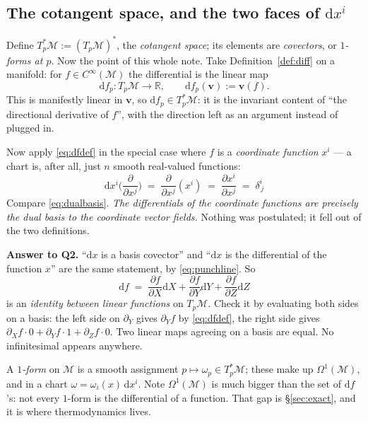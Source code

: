 \documentclass[10pt,a4paper]{article}
\newcommand{\dd}{\mathrm{d}}
\newcommand{\R}{\mathbb{R}}
\newcommand{\M}{\mathcal{M}}
\newcommand{\Om}{\Omega}
\newcommand{\pd}[2]{\frac{\partial #1}{\partial #2}}
\newcommand{\pdi}[1]{\frac{\partial}{\partial #1}}
\newcommand{\vv}{\mathbf{v}}
\theoremstyle{plain}
\theoremstyle{definition}
\numberwithin{equation}{section}
\begin{document}
\subsection{The cotangent space, and the two faces of $\dd x^i$}
\label{sec:twofaces}

Define $T_p^*\M:=(T_p\M)^*$, the \emph{cotangent space}; its elements are \emph{covectors}, or
\emph{$1$-forms at $p$}. Now the point of this whole note. Take Definition~\ref{def:diff} on a
manifold: for $f\in C^\infty(\M)$ the differential is the linear map
\begin{equation}
\dd f_p:T_p\M\to\R,\qquad \dd f_p(\vv):=\vv(f).
\label{eq:dfdef}
\end{equation}
This is manifestly linear in $\vv$, so $\dd f_p\in T_p^*\M$: it is the invariant content of
``the directional derivative of $f$'', with the direction left as an argument instead of
plugged in.

Now apply \eqref{eq:dfdef} in the special case where $f$ is a \emph{coordinate function} $x^i$
--- a chart is, after all, just $n$ smooth real-valued functions:
\begin{equation}
\boxed{\ \dd x^i\Big(\pdi{x^j}\Big) \;=\; \pdi{x^j}(x^i) \;=\; \pd{x^i}{x^j} \;=\; \delta^i_{\,j}\ }
\label{eq:punchline}
\end{equation}
Compare \eqref{eq:dualbasis}. \emph{The differentials of the coordinate functions are precisely
the dual basis to the coordinate vector fields.} Nothing was postulated; it fell out of the two
definitions.

\begin{keybox}
\textbf{Answer to Q2.} ``$\dd x$ is a basis covector'' and ``$\dd x$ is the differential of the
function $x$'' are the same statement, by \eqref{eq:punchline}. So
\[
\dd f \;=\; \pd{f}{X}\dd X + \pd{f}{Y}\dd Y + \pd{f}{Z}\dd Z
\]
is an \emph{identity between linear functions} on $T_p\M$. Check it by evaluating both sides on
a basis: the left side on $\partial_Y$ gives $\partial_Yf$ by \eqref{eq:dfdef}, the right side
gives $\partial_Xf\cdot0+\partial_Yf\cdot1+\partial_Zf\cdot0$. Two linear maps agreeing on a
basis are equal. No infinitesimal appears anywhere.
\end{keybox}

\noindent A \emph{$1$-form} on $\M$ is a smooth assignment $p\mapsto\omega_p\in T_p^*\M$; these
make up $\Om^1(\M)$, and in a chart $\omega=\omega_i(x)\,\dd x^i$. Note $\Om^1(\M)$ is much
bigger than the set of $\dd f$'s: not every $1$-form is the differential of a function. That
gap is \S\ref{sec:exact}, and it is where thermodynamics lives.
\end{document}
